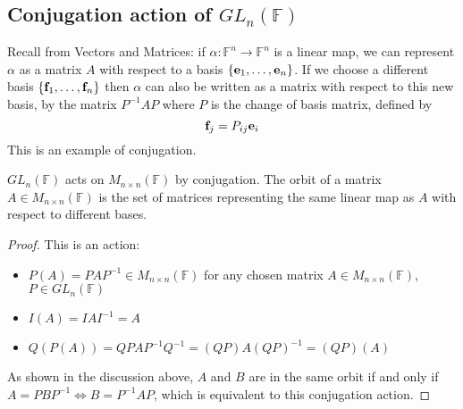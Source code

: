 \subsection{Conjugation action of \(GL_n(\mathbb F)\)}
Recall from Vectors and Matrices: if \(\alpha\colon \mathbb F^n \to \mathbb F^n\) is a linear map, we can represent \(\alpha\) as a matrix \(A\) with respect to a basis \(\{ \vb e_1, \dots, \vb e_n \}\).
If we choose a different basis \(\{ \vb f_1, \dots, \vb f_n \}\) then \(\alpha\) can also be written as a matrix with respect to this new basis, by the matrix \(P^{-1}AP\) where \(P\) is the change of basis matrix, defined by
\[
	\vb f_j = P_{ij}\vb e_i
\]
This is an example of conjugation.
\begin{proposition}
	\(GL_n(\mathbb F)\) acts on \(M_{n \times n}(\mathbb F)\) by conjugation.
	The orbit of a matrix \(A \in M_{n \times n}(\mathbb F)\) is the set of matrices representing the same linear map as \(A\) with respect to different bases.
\end{proposition}
\begin{proof}
	This is an action:
	\begin{itemize}
		\item \(P(A) = PAP^{-1} \in M_{n \times n}(\mathbb F)\) for any chosen matrix \(A \in M_{n \times n}(\mathbb F)\), \(P \in GL_n(\mathbb F)\)
		\item \(I(A) = IAI^{-1} = A\)
		\item \(Q(P(A)) = QPAP^{-1}Q^{-1} = (QP)A(QP)^{-1} = (QP)(A)\)
	\end{itemize}
	As shown in the discussion above, \(A\) and \(B\) are in the same orbit if and only if \(A = PBP^{-1} \iff B = P^{-1}AP\), which is equivalent to this conjugation action.
\end{proof}

